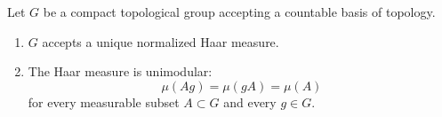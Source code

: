 \begin{theorem} \label{ThoBZBooOTxqcI}
    Let \( G\) be a compact topological group accepting a countable basis of topology.
    \begin{enumerate}
        \item
            \( G\) accepts a unique normalized Haar measure.
        \item
            The Haar measure is unimodular:
	\begin{equation}
		\mu(Ag)=\mu(gA)=\mu(A)
	\end{equation}
    for every measurable subset \( A\subset G\) and every \( g\in G\).
    \end{enumerate}
\end{theorem}


